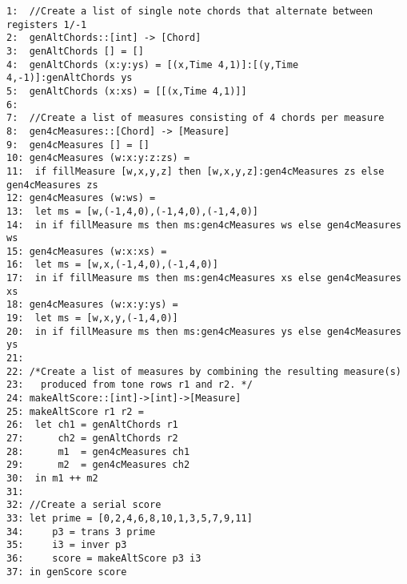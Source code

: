 \small
\begin{verbatim}
1:  //Create a list of single note chords that alternate between registers 1/-1
2:  genAltChords::[int] -> [Chord] 
3:  genAltChords [] = []
4:  genAltChords (x:y:ys) = [(x,Time 4,1)]:[(y,Time 4,-1)]:genAltChords ys
5:  genAltChords (x:xs) = [[(x,Time 4,1)]] 
6: 
7:  //Create a list of measures consisting of 4 chords per measure 
8:  gen4cMeasures::[Chord] -> [Measure] 
9:  gen4cMeasures [] = []
10: gen4cMeasures (w:x:y:z:zs) = 
11:  if fillMeasure [w,x,y,z] then [w,x,y,z]:gen4cMeasures zs else gen4cMeasures zs  
12: gen4cMeasures (w:ws) = 
13:  let ms = [w,(-1,4,0),(-1,4,0),(-1,4,0)]
14:  in if fillMeasure ms then ms:gen4cMeasures ws else gen4cMeasures ws
15: gen4cMeasures (w:x:xs) = 
16:  let ms = [w,x,(-1,4,0),(-1,4,0)]
17:  in if fillMeasure ms then ms:gen4cMeasures xs else gen4cMeasures xs
18: gen4cMeasures (w:x:y:ys) = 
19:  let ms = [w,x,y,(-1,4,0)]
20:  in if fillMeasure ms then ms:gen4cMeasures ys else gen4cMeasures ys
21:
22: /*Create a list of measures by combining the resulting measure(s) 
23:   produced from tone rows r1 and r2. */
24: makeAltScore::[int]->[int]->[Measure]
25: makeAltScore r1 r2 = 
26:  let ch1 = genAltChords r1
27:      ch2 = genAltChords r2
28:      m1  = gen4cMeasures ch1
29:      m2  = gen4cMeasures ch2
30:  in m1 ++ m2 
31:
32: //Create a serial score 
33: let prime = [0,2,4,6,8,10,1,3,5,7,9,11]
34:     p3 = trans 3 prime
35:     i3 = inver p3
36:     score = makeAltScore p3 i3
37: in genScore score
\end{verbatim}

